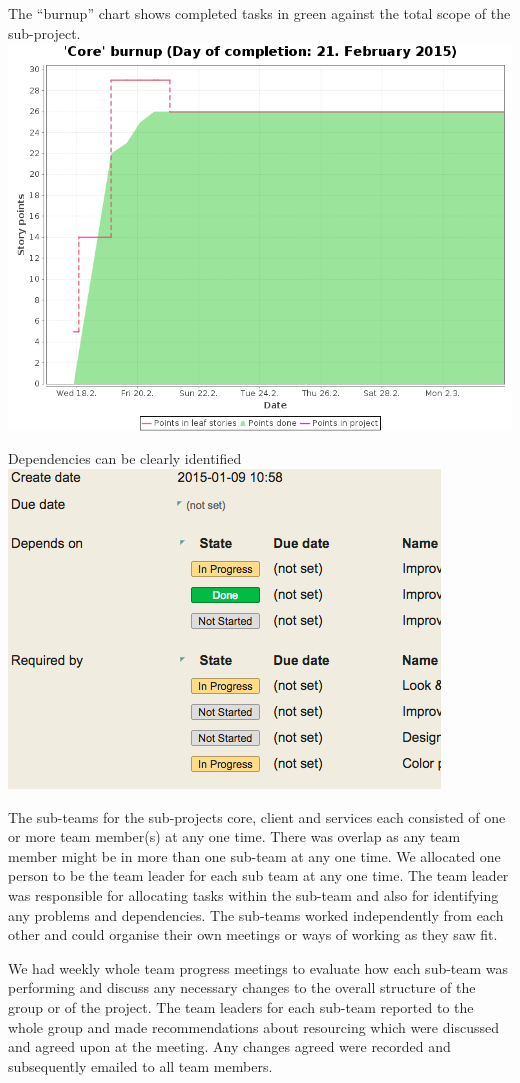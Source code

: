 The “burnup” chart shows completed tasks in green against the total scope of the sub-project. 
\includegraphics[scale=0.3]{./images/burnup_chart.png}

Dependencies can be clearly identified \\
\includegraphics[]{./images/dependencies.png}

The sub-teams for the sub-projects core, client and services each consisted of one or more team member(s) at any one time.  There was overlap as any team member might be in more than one sub-team at any one time.  We allocated one person to be the team leader for each sub team at any one time.  The team leader was responsible for allocating tasks within the sub-team and also for identifying any problems and dependencies.  The sub-teams worked independently from each other and could organise their own meetings or ways of working as they saw fit.

We had weekly whole team progress meetings to evaluate how each sub-team was performing and discuss any necessary changes to the overall structure of the group or of the project. The team leaders for each sub-team reported to the whole group and made recommendations about resourcing which were discussed and agreed upon at the meeting.  Any changes agreed were recorded and subsequently emailed to all team members.